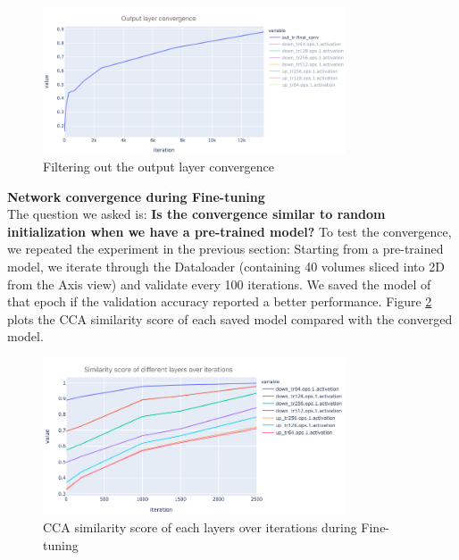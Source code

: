 \begin{figure}
	\centering
	\includegraphics[width=0.8\textwidth]{img/SVCCA/from_scratch_output_layer.png}
	\caption{Filtering out the output layer convergence}
	\label{fig:random_init_converge}
\end{figure}


\textbf{Network convergence during Fine-tuning}\\

The question we asked is: \textbf{Is the convergence similar to random initialization when we have a pre-trained model?}
To test the convergence, we repeated the experiment in the previous section: Starting from a pre-trained model, we iterate through the Dataloader (containing 40 volumes sliced into 2D from the Axis view) and validate every 100 iterations. We saved the model of that epoch if the validation accuracy reported a better performance. Figure \ref{fig:transfer-convergence} plots the CCA similarity score of each saved model compared with the converged model.

\begin{figure}
	\centering
	\includegraphics[width=0.8\textwidth]{img/SVCCA/CCA_score_transfer_learning}
	\caption{CCA similarity score of each layers over iterations during Fine-tuning}
	\label{fig:transfer-convergence}
\end{figure}

